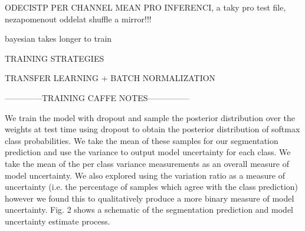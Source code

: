 ODECISTP PER CHANNEL MEAN PRO INFERENCI, a taky pro test file, nezapomenout oddelat shuffle a mirror!!!

bayesian takes longer to train

TRAINING STRATEGIES

TRANSFER LEARNING + BATCH NORMALIZATION

--------------TRAINING CAFFE NOTES---------------


We train the model with dropout and sample the posterior distribution over the weights at test time using dropout
to obtain the posterior distribution of softmax class probabilities. We take the mean of these samples for our segmentation prediction and use the variance to output model
uncertainty for each class. We take the mean of the per class
variance measurements as an overall measure of model uncertainty. We also explored using the variation ratio as
a measure of uncertainty (i.e. the percentage of samples
which agree with the class prediction) however we found
this to qualitatively produce a more binary measure of
model uncertainty. Fig. 2 shows a schematic of the segmentation prediction and model uncertainty estimate process.